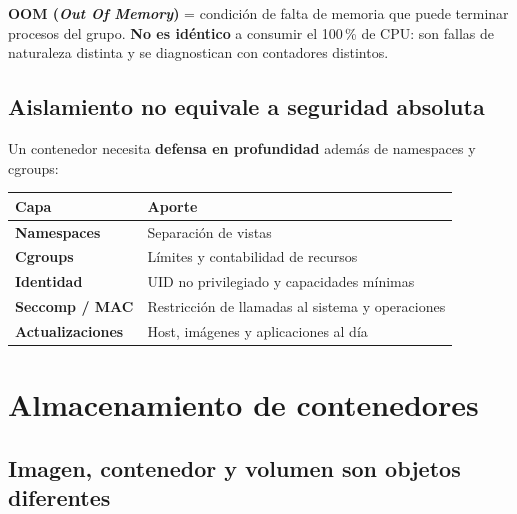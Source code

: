 \documentclass[11pt,a4paper]{article}
\begin{document}
\begin{defbox}
\textbf{OOM (\emph{Out Of Memory})} = condición de falta de memoria que puede terminar
procesos del grupo. \textbf{No es idéntico} a consumir el 100\,\% de CPU: son fallas
de naturaleza distinta y se diagnostican con contadores distintos.
\end{defbox}

\subsection{Aislamiento no equivale a seguridad absoluta}

Un contenedor necesita \textbf{defensa en profundidad} además de namespaces y cgroups:

\begin{center}
\renewcommand{\arraystretch}{1.3}
\begin{tabularx}{\textwidth}{@{}>{\bfseries}l >{\raggedright\arraybackslash}X@{}}
\toprule
\textbf{\normalfont\color{azulprof} Capa} & \textbf{\color{azulprof} Aporte} \\
\midrule
Namespaces      & Separación de vistas \\
Cgroups         & Límites y contabilidad de recursos \\
Identidad       & UID no privilegiado y capacidades mínimas \\
Seccomp / MAC   & Restricción de llamadas al sistema y operaciones \\
Actualizaciones & Host, imágenes y aplicaciones al día \\
\bottomrule
\end{tabularx}
\end{center}

\section{Almacenamiento de contenedores}

\subsection{Imagen, contenedor y volumen son objetos diferentes}
\end{document}

